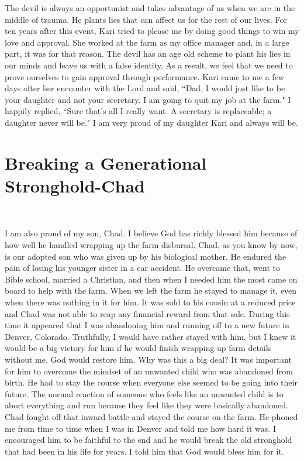 \documentclass[oneside,12pt]{book}
\begin{document}
The devil is always an opportunist and takes advantage of us when we are in the middle of trauma. He plants lies that can affect us for the rest of our lives. For ten years after this event,  Kari tried to please me by doing good things to win my love and approval. She worked at the farm as my office manager and, in a large part, it was for that reason. The devil has an age old scheme to plant his lies in our minds and leave us with a false identity. As a result, we feel that we need to prove ourselves to gain approval through performance. Kari came to me a few days after her encounter with the Lord and said, ``Dad, I would just like to be your daughter and not your secretary. I am going to quit my job at the farm." I happily replied, ``Sure that's all I really want. A secretary is replaceable; a daughter never will be." I am  very proud of my daughter Kari and always will be. 


\section{Breaking a Generational Stronghold-Chad}
\

I am also proud of my son, Chad. I believe God has richly blessed him because of how well he handled wrapping up the farm disbursal. Chad, as you know by now, is our adopted son who was given up by his biological mother. He endured the pain of losing his younger sister in a car accident. He overcame that, went to Bible school, married a Christian, and then when I needed him the most came on board to help with the farm. When we left the farm he stayed to manage it, even when there was nothing in it for him. It was sold to his cousin at a reduced price and Chad was not able to reap any financial reward from that sale. During this time it appeared that I was abandoning him and running off to a new future in Denver, Colorado. Truthfully, I would have rather stayed with him, but I knew it would be a big victory for him if he would finish wrapping up farm details without me. God would restore him. Why was this a big deal? It was important for him to overcome the mindset of an unwanted child who was abandoned from birth. He had to stay the course when everyone else seemed to be going into their future. The normal reaction of someone who feels like an unwanted child is to abort everything and run because they feel like they were basically abandoned. Chad fought off that inward battle and stayed the course on the farm. He phoned me from time to time when I was in Denver and told me how hard it was. I encouraged him to be faithful to the end and he would break the old stronghold that had been in his life for years. I told him that God would bless him for it. 
\end{document}
